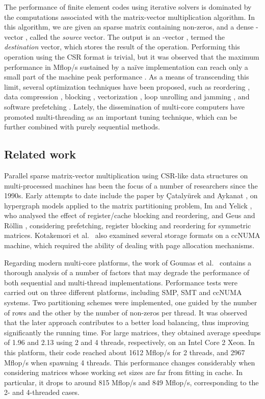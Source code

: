 \documentclass[11pt]{article}
\begin{document}
The performance of finite element codes using iterative
solvers is dominated by the computations associated with the matrix-vector
multiplication algorithm. In this algorithm, we are given an 
sparse matrix  containing  non-zeros, and a dense -vector ,
called the \textit{source} vector.  The output is an -vector , termed the
\textit{destination} vector, which stores the result of the  operation.
Performing this operation using the CSR format is trivial, but it was observed
that the maximum performance in Mflop/s sustained by a na\"ive implementation
can reach only a small part of the machine peak performance \cite{GKKS99a}.  As
a means of transcending this limit, several optimization techniques have been
proposed, such as reordering \cite{Tol97a,PH99a,WS97a,TJ92a}, data compression \cite{MGMM05a,WL06a},
blocking \cite{TJ92a,IYV04a,Tol97a,VM05a,PH99a,AGZ92a,NVDY07a}, vectorization \cite{AFM05a,BHZ93a}, loop unrolling
\cite{WS97a} and jamming \cite{MG04a}, and software prefetching \cite{Tol97a}.
Lately, the dissemination of multi-core computers have promoted
multi-threading as an important tuning
technique, which can be further combined with purely sequential methods.

\subsection{Related work}

Parallel sparse matrix-vector multiplication using CSR-like data structures on
multi-processed machines has been the focus of a number of researchers since
the 1990s.  Early attempts to date include the paper by {\c C}ataly\"urek and Aykanat \cite{CA96a}, on
hypergraph models applied to the matrix partitioning problem, Im and Yelick \cite{IY99a},
who analysed the effect of register/cache blocking and reordering, and
Geus and R{\"{o}}llin \cite{GR01a}, considering prefetching, register blocking and reordering for
symmetric matrices.  Kotakemori et al.~\cite{KHKNSN05a} also examined several storage formats on
a ccNUMA machine, which required the ability of dealing with page allocation
mechanisms.

Regarding modern multi-core platforms, the work of Goumas et al.~\cite{GKAKK08a} contains a
thorough analysis of a number of factors that may degrade the performance of
both sequential and multi-thread implementations.  Performance tests were
carried out on three different platforms, including SMP, SMT and ccNUMA
systems.
Two partitioning schemes were implemented, one guided by the number of rows
and the other by the number of non-zeros per thread.  It was
observed that the later approach contributes to a better load balancing,
thus improving significantly the running time.
For large matrices, they obtained average speedups of 1.96 and 2.13 using 2 and
4 threads, respectively, on an Intel Core 2 Xeon.
In this platform, their code reached about 1612 Mflop/s for 2 threads,
and 2967 Mflop/s when spawning 4 threads.
This performance changes
considerably when considering matrices whose working set sizes are far from fitting in cache.
In particular, it drops to around 815 Mflop/s and 849 Mflop/s, corresponding to the 2-
and 4-threaded cases.
\end{document}
